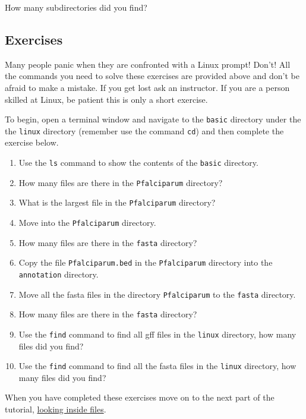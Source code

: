 \documentclass[11pt]{article}
\providecommand{\tightlist}{%
      \setlength{\itemsep}{0pt}\setlength{\parskip}{0pt}}
\begin{document}
    How many subdirectories did you find?

    \hypertarget{exercises}{%
\subsection{Exercises}\label{exercises}}

Many people panic when they are confronted with a Linux prompt! Don't!
All the commands you need to solve these exercises are provided above
and don't be afraid to make a mistake. If you get lost ask an
instructor. If you are a person skilled at Linux, be patient this is
only a short exercise.

To begin, open a terminal window and navigate to the \texttt{basic}
directory under the the \texttt{linux} directory (remember use the
command \texttt{cd}) and then complete the exercise below.

\begin{enumerate}
\def\labelenumi{\arabic{enumi}.}
\tightlist
\item
  Use the \texttt{ls} command to show the contents of the \texttt{basic}
  directory.
\item
  How many files are there in the \texttt{Pfalciparum} directory?
\item
  What is the largest file in the \texttt{Pfalciparum} directory?
\item
  Move into the \texttt{Pfalciparum} directory.
\item
  How many files are there in the \texttt{fasta} directory?
\item
  Copy the file \texttt{Pfalciparum.bed} in the \texttt{Pfalciparum}
  directory into the \texttt{annotation} directory.
\item
  Move all the fasta files in the directory \texttt{Pfalciparum} to the
  \texttt{fasta} directory.
\item
  How many files are there in the \texttt{fasta} directory?
\item
  Use the \texttt{find} command to find all gff files in the
  \texttt{linux} directory, how many files did you find?
\item
  Use the \texttt{find} command to find all the fasta files in the
  \texttt{linux} directory, how many files did you find?
\end{enumerate}

    When you have completed these exercises move on to the next part of the
tutorial, \href{files.ipynb}{looking inside files}.
\end{document}
